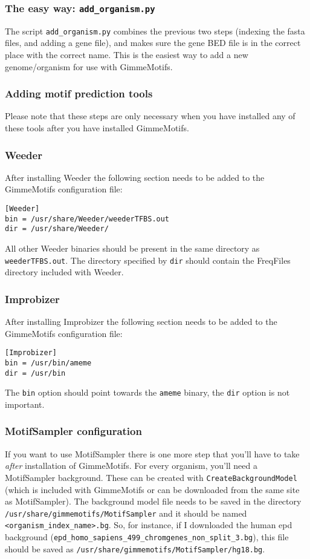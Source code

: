\documentclass[11pt]{article}
\begin{document}
\subsubsection{The easy way: \texttt{add\_organism.py}}
The script \texttt{add\_organism.py} combines the previous two steps (indexing the fasta files, and adding a gene file), and makes sure the gene BED file is in the correct place with the correct name. This is the easiest way to add a new genome/organism for use with GimmeMotifs.

\subsubsection{Adding motif prediction tools} \label{sec:adding_tools}
Please note that these steps are only necessary when you have installed any of these tools after you have installed GimmeMotifs.

\subsubsection*{Weeder}
After installing Weeder the following section needs to be added to the GimmeMotifs configuration file:
\begin{verbatim}
[Weeder]
bin = /usr/share/Weeder/weederTFBS.out
dir = /usr/share/Weeder/ 
\end{verbatim}
All other Weeder binaries should be present in the same directory as \texttt{weederTFBS.out}. The directory specified by \texttt{dir} should contain the FreqFiles directory included with Weeder.

\subsubsection*{Improbizer}
After installing Improbizer the following section needs to be added to the GimmeMotifs configuration file:
\begin{verbatim}
[Improbizer]
bin = /usr/bin/ameme
dir = /usr/bin
\end{verbatim}
The \texttt{bin} option should point towards the \texttt{ameme} binary, the \texttt{dir} option is not important.

\subsubsection{MotifSampler configuration}
\label{sec:MotifSampler}
If you want to use MotifSampler there is one more step that you'll have to take \emph{after} installation of GimmeMotifs. For every organism, you'll need a MotifSampler background. These can be created with \texttt{CreateBackgroundModel} (which is included with GimmeMotifs or can be downloaded from the same site as MotifSampler). The background model file needs to be saved in the directory \texttt{/usr/share/gimmemotifs/MotifSampler} and it should be named \texttt{<organism\_index\_name>.bg}. So, for instance, if I downloaded the human epd background (\texttt{epd\_homo\_sapiens\_499\_chromgenes\_non\_split\_3.bg}), this file should be saved as \texttt{/usr/share/gimmemotifs/MotifSampler/hg18.bg}.
\end{document}
